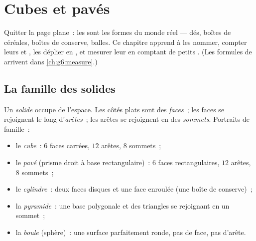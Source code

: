 \chapter{Cubes et pavés}\label{ch:g5:solids}

Quitter la page plane~: les  sont les formes du monde réel ---
dés, boîtes de céréales, boîtes de conserve, balles. Ce chapitre
apprend à les nommer, compter leurs  et , les déplier en
, et mesurer leur  en comptant de petits . (Les
formules de  arrivent dans \cref{ch:g6:measure}.)

\section{La famille des solides}

\begin{definition}\label{def:g5:solids:def}
Un \emph{solide} occupe de l'espace. Les côtés plats sont
des \emph{faces}~; les faces se rejoignent le long
d'\emph{arêtes}~; les arêtes se rejoignent en des
\emph{sommets}. Portraits de
famille~:
\begin{itemize}
  \item le \emph{cube}~: $6$ faces carrées, $12$ arêtes,
        $8$ sommets~;
  \item le \emph{pavé} (prisme droit à base
        rectangulaire)~: $6$ faces rectangulaires, $12$ arêtes,
        $8$ sommets~;
  \item le \emph{cylindre}~: deux faces disques et une face
        enroulée (une boîte de conserve)~;
  \item la \emph{pyramide}~: une base polygonale et des triangles se
        rejoignant en un sommet~;
  \item la \emph{boule} (sphère)~: une surface parfaitement ronde,
        pas de face, pas d'arête.
\end{itemize}
\end{definition}


